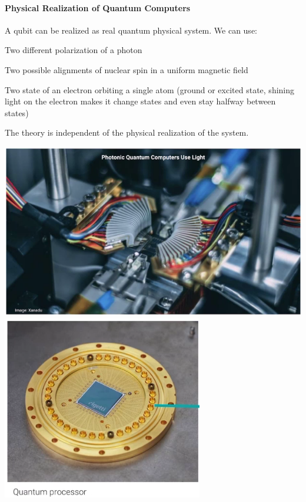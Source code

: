 \documentclass[10pt]{report}
\begin{document}
\paragraph{Physical Realization of Quantum Computers}
A qubit can be realized as real quantum physical system. We can use:
\begin{list}{}{}
	\item Two different polarization of a photon
	\item Two possible alignments of nuclear spin in a uniform magnetic field
	\item Two state of an electron orbiting a single atom (ground or excited state, shining light on the electron makes it change states and even stay halfway between states)
\end{list}
The theory is independent of the physical realization of the system.
\begin{center}
	\includegraphics[scale=0.5]{7.png}
	\includegraphics[scale=0.7]{8.png}
\end{center}
\end{document}
